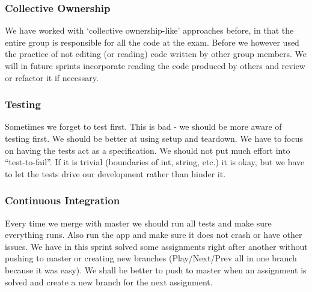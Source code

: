 \subsubsection{Collective Ownership}
We have worked with ‘collective ownership-like’ approaches before, in that the entire group is responsible for all the code at the exam.
Before we however used the practice of not editing (or reading) code written by other group members.
We will in future sprints incorporate reading the code produced by others and review or refactor it if necessary.

\subsubsection{Testing}
Sometimes we forget to test first. This is bad - we should be more aware of testing first.
We should be better at using setup and teardown.
We have to focus on having the tests act as a specification. We should not put much effort into “test-to-fail”. If it is trivial (boundaries of int, string, etc.) it is okay, but we have to let the tests drive our development rather than hinder it.

\subsubsection{Continuous Integration}
Every time we merge with master we should run all tests and make sure everything runs. Also run the app and make sure it does not crash or have other issues.
We have in this sprint solved some assignments right after another without pushing to master or creating new branches (Play/Next/Prev all in one branch because it was easy). We shall be better to push to master when an assignment is solved and create a new branch for the next assignment.
